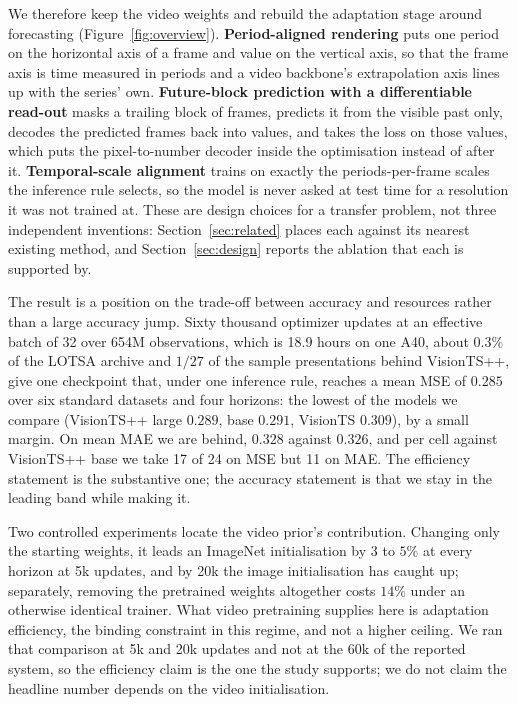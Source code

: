 We therefore keep the video weights and rebuild the adaptation stage around forecasting
(Figure~\ref{fig:overview}). \textbf{Period-aligned rendering} puts one period on the horizontal
axis of a frame and value on the vertical axis, so that the frame axis is time measured in periods
and a video backbone's extrapolation axis lines up with the series' own. \textbf{Future-block
prediction with a differentiable read-out} masks a trailing block of frames, predicts it from the
visible past only, decodes the predicted frames back into values, and takes the loss on those
values, which puts the pixel-to-number decoder inside the optimisation instead of after it.
\textbf{Temporal-scale alignment} trains on exactly the periods-per-frame scales the inference rule
selects, so the model is never asked at test time for a resolution it was not trained at. These are
design choices for a transfer problem, not three independent inventions: Section~\ref{sec:related}
places each against its nearest existing method, and Section~\ref{sec:design} reports the ablation
that each is supported by.

The result is a position on the trade-off between accuracy and resources rather than a large
accuracy jump.
Sixty thousand optimizer updates at an effective batch of 32 over 654M observations, which is 18.9
hours on one A40, about $0.3\%$ of the LOTSA archive and $1/27$ of the sample presentations behind
VisionTS++, give one checkpoint that, under one inference rule, reaches a mean MSE of $0.285$ over six
standard datasets and four horizons: the lowest of the models we compare (VisionTS++ large $0.289$,
base $0.291$, VisionTS $0.309$), by a small margin. On mean MAE we are behind, $0.328$ against
$0.326$, and per cell against VisionTS++ base we take 17 of 24 on MSE but 11 on MAE. The efficiency
statement is the substantive one; the accuracy statement is that we stay in the leading band while
making it.

Two controlled experiments locate the video prior's contribution. Changing only the starting weights,
it leads an ImageNet initialisation by $3$ to $5\%$ at every horizon at 5k updates, and by 20k the
image initialisation has caught up; separately, removing the pretrained weights altogether costs
$14\%$ under an otherwise identical trainer. What video pretraining supplies here is adaptation
efficiency, the binding constraint in this regime, and not a higher ceiling. We ran that
comparison at 5k and 20k updates and not at the 60k of the reported system, so the efficiency claim
is the one the study supports; we do not claim the headline number depends on the video
initialisation.

